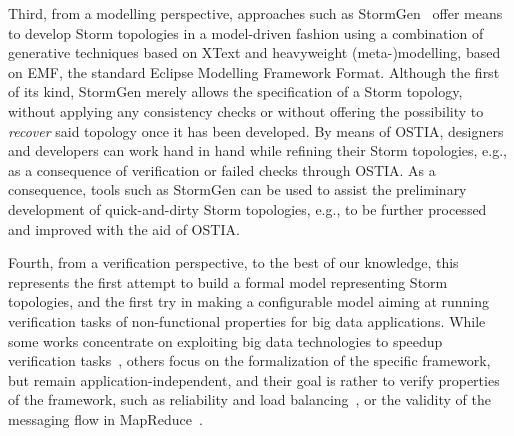 Third, from a modelling perspective, approaches such as StormGen~\cite{stormgen} offer means to develop Storm topologies in a model-driven fashion using a combination of generative techniques based on XText and heavyweight (meta-)modelling, based on EMF, the standard Eclipse Modelling Framework Format. Although the first of its kind, StormGen merely allows the specification of a Storm topology, without applying any consistency checks or without offering the possibility to \emph{recover} said topology once it has been developed. By means of OSTIA, designers and developers can work hand in hand while refining their Storm topologies, e.g., as a consequence of verification or failed checks through OSTIA. As a consequence, tools such as StormGen can be used to assist the preliminary development of quick-and-dirty Storm topologies, e.g., to be further processed and improved with the aid of OSTIA.

Fourth, from a verification perspective, to the best of our knowledge, this represents the first attempt to build a formal model representing Storm topologies, and the first try in making a configurable model aiming at running verification tasks of non-functional properties for big data applications. While some works concentrate on exploiting big data technologies to speedup verification tasks~\cite{camilli2014}, others focus on the formalization of the specific framework, but remain application-independent, and their goal is rather to verify properties of the framework, such as reliability and load balancing~\cite{dicomputational}, or the validity of the messaging flow in MapReduce~\cite{yang2010formalizing}.

